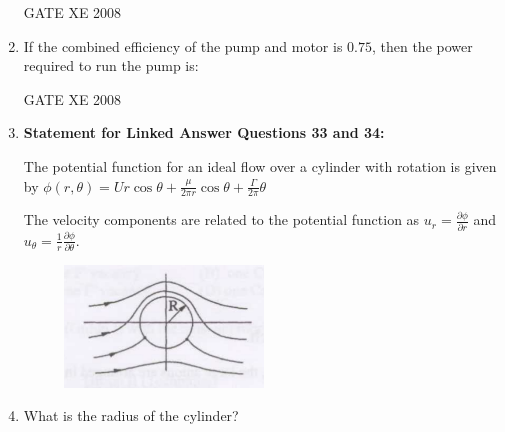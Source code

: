 \documentclass[12pt]{article}
\begin{document}
\begin{enumerate}[label=Q\arabic*.]
GATE XE 2008


\item If the combined efficiency of the pump and motor is $0.75$, then the power required to run the pump is:  

\begin{enumerate}[label=(\Alph*)]
\end{enumerate}

GATE XE 2008

\item[] \textbf{Statement for Linked Answer Questions 33 and 34:}  

The potential function for an ideal flow over a cylinder with rotation is given by  
$\phi(r,\theta) = U r \cos \theta + \frac{\mu}{2 \pi r} \cos \theta + \frac{\Gamma}{2\pi} \theta$  

The velocity components are related to the potential function as  
$u_r = \frac{\partial \phi}{\partial r}$ and $u_\theta = \frac{1}{r} \frac{\partial \phi}{\partial \theta}$.  

\begin{figure}[H]
\centering
  \includegraphics[width=0.5\textwidth]{figs/ass1_d_q33.png}
  \caption{}
\end{figure}

\item What is the radius of the cylinder?  

\begin{enumerate}[label=(\Alph*)]
\end{enumerate}


\end{enumerate}
\end{document}
